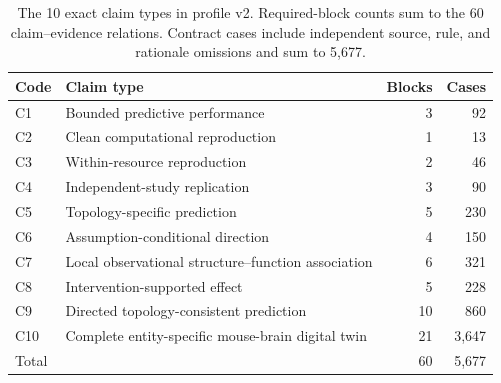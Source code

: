 \begin{table}[!htbp]
\centering
\caption{The 10 exact claim types in profile v2. Required-block counts sum to the 60 claim--evidence relations. Contract cases include independent source, rule, and rationale omissions and sum to 5,677.}
\label{tab:profile-v2-claims}
\footnotesize
\renewcommand{\arraystretch}{1.08}
\begin{tabularx}{\textwidth}{@{}p{}Y r r@{}}
\toprule
Code & Claim type & Blocks & Cases \\
\midrule
C1 & Bounded predictive performance & 3 & 92 \\
C2 & Clean computational reproduction & 1 & 13 \\
C3 & Within-resource reproduction & 2 & 46 \\
C4 & Independent-study replication & 3 & 90 \\
C5 & Topology-specific prediction & 5 & 230 \\
C6 & Assumption-conditional direction & 4 & 150 \\
C7 & Local observational structure--function association & 6 & 321 \\
C8 & Intervention-supported effect & 5 & 228 \\
C9 & Directed topology-consistent prediction & 10 & 860 \\
C10 & Complete entity-specific mouse-brain digital twin & 21 & 3,647 \\
\midrule
Total & & 60 & 5,677 \\
\bottomrule
\end{tabularx}
\end{table}

